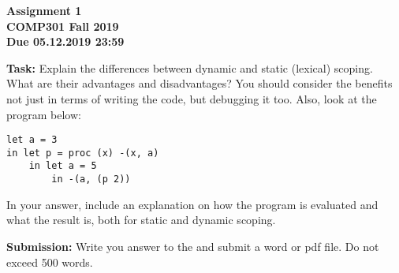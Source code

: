 \documentclass[12pt,reqno]{amsart}
\begin{document}
\thispagestyle{empty}
\begin{center}
\large\textbf{Assignment 1 \\ COMP301 Fall 2019} \\
\normalsize\textbf{Due 05.12.2019 23:59} \\
\end{center}


\textbf{Task:} Explain the differences between dynamic and static (lexical) scoping. What are their advantages and disadvantages? You should consider the benefits not just in terms of writing the code, but debugging it too. Also, look at the program below:
\begin{lstlisting}
let a = 3
in let p = proc (x) -(x, a)
    in let a = 5
        in -(a, (p 2)) 
\end{lstlisting}
In your answer, include an explanation on how the program is evaluated and what the result is, both for static and dynamic scoping.

\textbf{Submission:} Write you answer to the and submit a word or pdf file. Do not exceed 500 words. 
\end{document}
